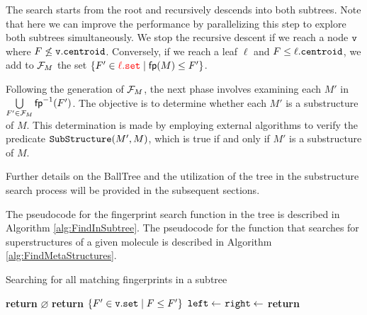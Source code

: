 The search starts from the root and recursively descends into both subtrees. Note that here we can improve the performance by parallelizing this step to explore both subtrees simultaneously. We stop the recursive descent if we reach a node ${\tt v}$ where $F \not\le {\tt v.centroid}$. Conversely, if we reach a leaf $\ell$ and $F \le \ell.{\tt centroid}$, we add to $\mathcal{F}_M$ the set $\{F' \in {\color{red}{\tt \ell.set}} \mid {\sf fp}(M) \le F'\}$.

Following the generation of $\mathcal{F}_M$, the next phase involves examining each $M'$ in $\bigcup\limits_{F' \in \mathcal{F}_M} {\sf fp}^{-1}(F')$. The objective is to determine whether each $M'$ is a substructure of $M$. This determination is made by employing external algorithms to verify the predicate $\verb|SubStructure|(M', M)$, which is true if and only if $M'$ is a substructure of $M$. 

Further details on the BallTree and the utilization of the tree in the substructure search process will be provided in the subsequent sections.



The pseudocode for the fingerprint search function in the tree is described in Algorithm \ref{alg:FindInSubtree}. The pseudocode for the function that searches for superstructures of a given molecule is described in Algorithm \ref{alg:FindMetaStructures}.

\begin{algorithm}[h!]
  \caption{Searching for all matching fingerprints in a subtree}\label{alg:FindInSubtree}
  \begin{algorithmic}[1]
     \label{alg:FindInSubtree:line:RecursionCut}
      \State \textbf{return} $\varnothing$
      \State \textbf{return} $\{F' \in {\tt v.set} \mid F \le F' \}$ 
    \Else
      \State ${\tt left} \gets $   
      \State ${\tt right} \gets $  
      \State \textbf{return}  
    \EndIf
    \EndProcedure
  \end{algorithmic}
\end{algorithm}

